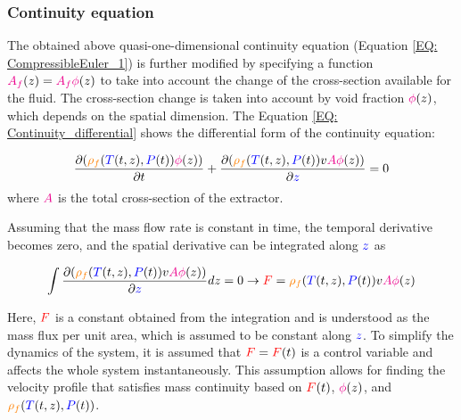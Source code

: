 \documentclass[../Article_Model_Parameters.tex]{subfiles}
\begin{document}
		
	\subsubsection{Continuity equation} \label{CH: Continuity}
	The obtained above quasi-one-dimensional continuity equation (Equation \ref{EQ: CompressibleEuler_1}) is further modified by specifying a function ${\color{magenta}A_f}(z) = {\color{magenta}A_f\phi}(z)$ to take into account the change of the cross-section available for the fluid. The cross-section change is taken into account by void fraction ${\color{magenta}\phi}(z)$, which depends on the spatial dimension. The Equation \ref{EQ: Continuity_differential} shows the differential form of the continuity equation: 
	
	{\footnotesize
		\begin{equation} \label{EQ: Continuity_differential}
			\frac{\partial ({\color{orange}\rho_f}({\color{blue}T}(t,z),{\color{blue}P}(t)) {\color{magenta}\phi}(z))}{\partial t} + \frac{\partial ({\color{orange}\rho_f}({\color{blue}T}(t,z),{\color{blue}P}(t)) v {\color{magenta}A\phi}(z))}{\partial {\color{blue}z}} = 0
		\end{equation}
	}
	where ${\color{magenta} A}$ is the total cross-section of the extractor.
	
	
	Assuming that the mass flow rate is constant in time, the temporal derivative becomes zero, and the spatial derivative can be integrated along ${\color{blue}z}$ as
	
	{\footnotesize
		\begin{equation}
			\int \frac{\partial ({\color{orange}\rho_f}({\color{blue}T}(t,z),{\color{blue}P}(t)) v {\color{magenta}A \phi}(z) )}{\partial {\color{blue}z}} dz = 0 \rightarrow {\color{red}F}={\color{orange}\rho_f}({\color{blue}T}(t,z),{\color{blue}P}(t)) v {\color{magenta}A\phi}(z)
		\end{equation}
	}
	
	Here, ${\color{red}F}$ is a constant obtained from the integration and is understood as the mass flux per unit area, which is assumed to be constant along ${\color{blue}z}$. To simplify the dynamics of the system, it is assumed that ${\color{red}F}={\color{red}F}(t)$ is a control variable and affects the whole system instantaneously. This assumption allows for finding the velocity profile that satisfies mass continuity based on ${\color{red}F}(t)$, ${\color{magenta}\phi}(z)$, and ${\color{orange}\rho_f}({\color{blue}T}(t,z),{\color{blue}P}(t))$.
	
\end{document}
